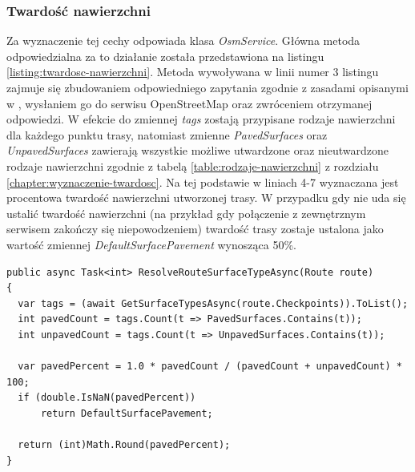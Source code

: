 \subsubsection{Twardość nawierzchni}
Za wyznaczenie tej cechy odpowiada klasa \textit{OsmService}. Główna metoda odpowiedzialna za to działanie została przedstawiona na listingu \ref{listing:twardosc-nawierzchni}. Metoda wywoływana w linii numer 3 listingu zajmuje się zbudowaniem odpowiedniego zapytania zgodnie z zasadami opisanymi w \cite{overpass-wiki}, wysłaniem go do serwisu OpenStreetMap \cite{osm} oraz zwróceniem otrzymanej odpowiedzi. W efekcie do zmiennej \textit{tags} zostają przypisane rodzaje nawierzchni dla każdego punktu trasy, natomiast zmienne \textit{PavedSurfaces} oraz \textit{UnpavedSurfaces} zawierają wszystkie możliwe utwardzone oraz nieutwardzone rodzaje nawierzchni zgodnie z tabelą \ref{table:rodzaje-nawierzchni} z rozdziału \ref{chapter:wyznaczenie-twardosc}. Na tej podstawie w liniach 4-7 wyznaczana jest procentowa twardość nawierzchni utworzonej trasy. 
W przypadku gdy nie uda się ustalić twardość nawierzchni (na przykład gdy połączenie z zewnętrznym serwisem zakończy się niepowodzeniem) twardość trasy zostaje ustalona jako wartość zmiennej \textit{DefaultSurfacePavement} wynosząca 50\%.
\begin{lstlisting}[caption={Wyznaczenie poziomu terenu},label=listing:twardosc-nawierzchni]
public async Task<int> ResolveRouteSurfaceTypeAsync(Route route)
{
  var tags = (await GetSurfaceTypesAsync(route.Checkpoints)).ToList();
  int pavedCount = tags.Count(t => PavedSurfaces.Contains(t));
  int unpavedCount = tags.Count(t => UnpavedSurfaces.Contains(t));

  var pavedPercent = 1.0 * pavedCount / (pavedCount + unpavedCount) * 100;
  if (double.IsNaN(pavedPercent))
      return DefaultSurfacePavement;

  return (int)Math.Round(pavedPercent);
}
\end{lstlisting}

